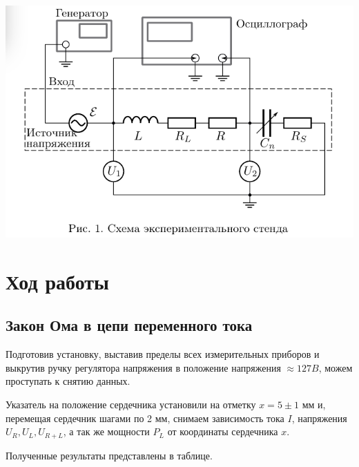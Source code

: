 \documentclass[a4paper, 12pt]{article}%
\begin{document}
\begin{center}

    \includegraphics[scale=0.65]{pics/scheme1.png} \\

\end{center}

\section{Ход работы}

\subsection{Закон Ома в цепи переменного тока}

Подготовив установку, выставив пределы всех измерительных приборов и выкрутив ручку регулятора напряжения в положение напряжения $\approx 127 B$, можем проступать к снятию данных.

Указатель на положение сердечника установили на отметку $x = 5 \pm 1 \text{ мм} $ и, перемещая сердечник шагами по 2 мм, снимаем зависимость тока $I$, напряжения $U_R, U_L, U_{R+L}$, а так же мощности $P_L$ от координаты сердечника $x$.

Полученные результаты представлены в таблице.
\end{document}
